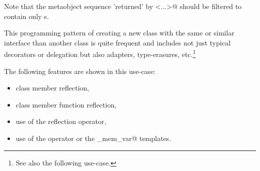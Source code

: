 Note that the metaobject sequence 'returned' by \verb@members<...>@ should
be filtered to contain only s.

This programming pattern of creating a new class with the same or similar interface
than another class is quite frequent and includes not just typical decorators or delegation
but also adapters, type-erasures, etc.\footnote{See also the following use-case.}

The following features are shown in this use-case:

\begin{itemize}
\item{class member reflection,}
\item{class member function reflection,}
\item{use of the reflection operator,}
\item{use of the \verb@identifier@ operator or the \verb@named_mem_var@ templates.}
\end{itemize}


